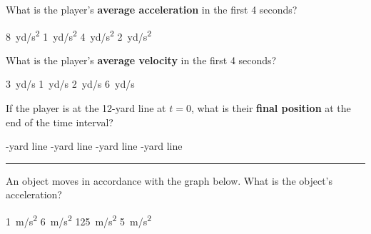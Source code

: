 \documentclass[]{exam}
\theoremstyle{definition}
\begin{document}
\begin{questions}
\question \label{prob:FootballPlayer1}
What is the player's \textbf{average acceleration} in the first 4 seconds?

\begin{choices}
\choice \SI{8}{yd/s^2}
\correctchoice \SI{1}{yd/s^2}
\choice \SI{4}{yd/s^2}
\choice \SI{2}{yd/s^2}
\end{choices}

\question \label{prob:FootballPlayer2}
What is the player's \textbf{average velocity} in the first 4 seconds?

\begin{choices}
\choice \SI{3}{yd/s}
\choice \SI{1}{yd/s}
\choice \SI{2}{yd/s}
\correctchoice \SI{6}{yd/s}
\end{choices}

\question \label{prob:FootballPlayer3}
If the player is at the 12-yard line at $t=0$, what is their \textbf{final position} at the end of the time interval?

\begin{choices}
-yard line
-yard line
-yard line
-yard line
\end{choices}

\vspace{1em}
\hrule


\question
An object moves in accordance with the graph below. What is the object's acceleration?
\vspace{1em}

\begin{minipage}{0.3\textwidth}
    \begin{choices}
    \choice \SI{1}{m/s^2}
    \choice \SI{6}{m/s^2}
    \choice \SI{125}{m/s^2}
    \CorrectChoice \SI{5}{m/s^2}
    \end{choices}
\end{minipage}%
\begin{minipage}{0.3\textwidth}
\end{minipage}








\end{questions}
\end{document}
